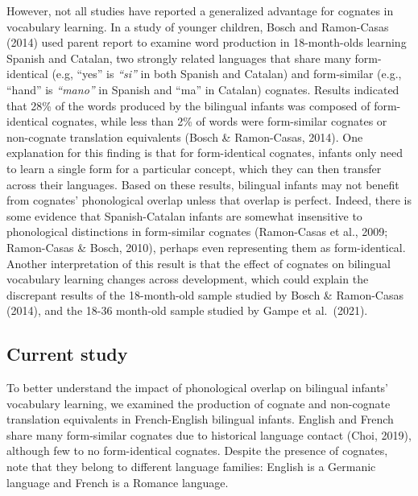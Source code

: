 \documentclass[
  english,
  ,man,floatsintext]{apa6}
\begin{document}
However, not all studies have reported a generalized advantage for cognates in vocabulary learning. In a study of younger children, Bosch and Ramon-Casas (2014) used parent report to examine word production in 18-month-olds learning Spanish and Catalan, two strongly related languages that share many form-identical (e.g, ``yes'' is \emph{``si''} in both Spanish and Catalan) and form-similar (e.g., ``hand'' is \emph{``mano''} in Spanish and ``ma'' in Catalan) cognates. Results indicated that 28\% of the words produced by the bilingual infants was composed of form-identical cognates, while less than 2\% of words were form-similar cognates or non-cognate translation equivalents (Bosch \& Ramon-Casas, 2014). One explanation for this finding is that for form-identical cognates, infants only need to learn a single form for a particular concept, which they can then transfer across their languages. Based on these results, bilingual infants may not benefit from cognates' phonological overlap unless that overlap is perfect. Indeed, there is some evidence that Spanish-Catalan infants are somewhat insensitive to phonological distinctions in form-similar cognates (Ramon-Casas et al., 2009; Ramon-Casas \& Bosch, 2010), perhaps even representing them as form-identical. Another interpretation of this result is that the effect of cognates on bilingual vocabulary learning changes across development, which could explain the discrepant results of the 18-month-old sample studied by Bosch \& Ramon-Casas (2014), and the 18-36 month-old sample studied by Gampe et al.~(2021).

\hypertarget{current-study}{%
\subsection{Current study}\label{current-study}}

To better understand the impact of phonological overlap on bilingual infants' vocabulary learning, we examined the production of cognate and non-cognate translation equivalents in French-English bilingual infants. English and French share many form-similar cognates due to historical language contact (Choi, 2019), although few to no form-identical cognates. Despite the presence of cognates, note that they belong to different language families: English is a Germanic language and French is a Romance language.
\end{document}
